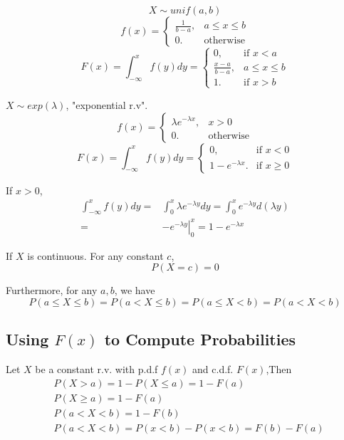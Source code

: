 \begin{exmp}
\[X \sim unif(a,b)\]
\[f(x)=\begin{cases}
\frac{1}{b-a}, 	&a \leq x \leq b\\
0. &\text{otherwise}
\end{cases}\]
\[F(x)=\int_{-\infty}^{x}f(y)dy=\begin{cases}
0,		&\text{if } x < a \\
\frac{x-a}{b-a}, 	&a \leq x \leq b\\
1. 		&\text{if } x > b 
\end{cases}\]
\end{exmp}

\begin{exmp}
$X \sim exp(\lambda)$, "exponential r.v".
\[f(x)=\begin{cases}
\lambda e^{-\lambda x}, 	& x >0\\
0. &\text{otherwise}
\end{cases}\]
\[F(x)=\int_{-\infty}^{x}f(y)dy=\begin{cases}
0,		&\text{if } x < 0 \\
1-e^{-\lambda x}. 		&\text{if } x \geq 0
\end{cases}\]

If $x>0$,
\begin{align*}
\int_{-\infty}^{x}f(y)dy= & \int_{0}^{x}\lambda e^{-\lambda y}dy=\int_{0}^{x}e^{-\lambda y}d(\lambda y)\\
= & \left.-e^{-\lambda y}\right|_0^x =1-e^{-\lambda x}
\end{align*}
\end{exmp}

\begin{prop}
If $X$ is continuous. For any constant $c$,
\[P(X=c)=0\]

Furthermore, for any $a,b$, we have
\[P(a \leq X \leq b)=P(a <X\leq b)=P(a \leq X< b)=P(a <X< b)\]
\end{prop}

\subsection{Using $F(x)$ to Compute Probabilities}
Let $X$ be a constant r.v. with p.d.f $f(x)$ and c.d.f. $F(x)$,Then
\begin{align*}
&P(X>a)=1-P(X\leq a)=1-F(a)\\
&P(X \geq a)=1-F(a)	\\
&P(a < X <b)=1-F(b)	\\
&P(a<X<b)=P(x<b)-P(x<b)=F(b)-F(a)
\end{align*}

